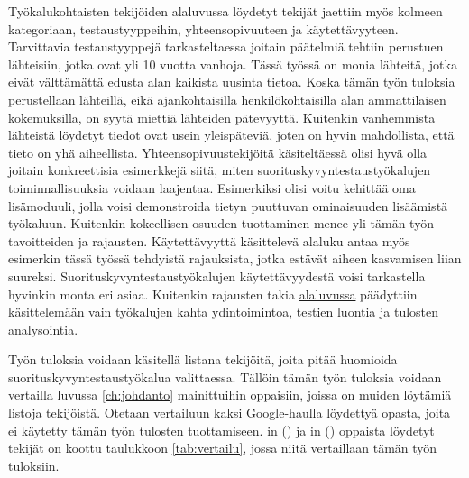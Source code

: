Työkalukohtaisten tekijöiden alaluvussa löydetyt tekijät jaettiin myös kolmeen kategoriaan, testaustyyppeihin, yhteensopivuuteen ja käytettävyyteen. Tarvittavia testaustyyppejä tarkasteltaessa joitain päätelmiä tehtiin perustuen lähteisiin, jotka ovat yli 10 vuotta vanhoja. Tässä työssä on monia lähteitä, jotka eivät välttämättä edusta alan kaikista uusinta tietoa. Koska tämän työn tuloksia perustellaan lähteillä, eikä ajankohtaisilla henkilökohtaisilla alan ammattilaisen kokemuksilla, on syytä miettiä lähteiden pätevyyttä. Kuitenkin vanhemmista lähteistä löydetyt tiedot ovat usein yleispäteviä, joten on hyvin mahdollista, että tieto on yhä aiheellista. Yhteensopivuustekijöitä käsiteltäessä olisi hyvä olla joitain konkreettisia esimerkkejä siitä, miten suorituskyvyntestaustyökalujen toiminnallisuuksia voidaan laajentaa. Esimerkiksi olisi voitu kehittää oma lisämoduuli, jolla voisi demonstroida tietyn puuttuvan ominaisuuden lisäämistä työkaluun. Kuitenkin kokeellisen osuuden tuottaminen menee yli tämän työn tavoitteiden ja rajausten. Käytettävyyttä käsittelevä alaluku antaa myös esimerkin tässä työssä tehdyistä rajauksista, jotka estävät aiheen kasvamisen liian suureksi. Suorituskyvyntestaustyökalujen käytettävyydestä voisi tarkastella hyvinkin monta eri asiaa. Kuitenkin rajausten takia \hyperref[ssec:käytettävyys]{alaluvussa} päädyttiin käsittelemään vain työkalujen kahta ydintoimintoa, testien luontia ja tulosten analysointia.

Työn tuloksia voidaan käsitellä listana tekijöitä, joita pitää huomioida suorituskyvyntestaustyökalua valittaessa. Tällöin tämän työn tuloksia voidaan vertailla luvussa \ref{ch:johdanto} mainittuihin oppaisiin, joissa on muiden löytämiä listoja tekijöistä. Otetaan vertailuun kaksi Google-haulla löydettyä opasta, joita ei käytetty tämän työn tulosten tuottamiseen. \citeauthor{Tools8ThingsToConsider}in (\citeyear{Tools8ThingsToConsider}) ja \citeauthor{HowToChooseTheRight}in (\citeyear{HowToChooseTheRight}) oppaista löydetyt tekijät on koottu taulukkoon \ref{tab:vertailu}, jossa niitä vertaillaan tämän työn tuloksiin.

